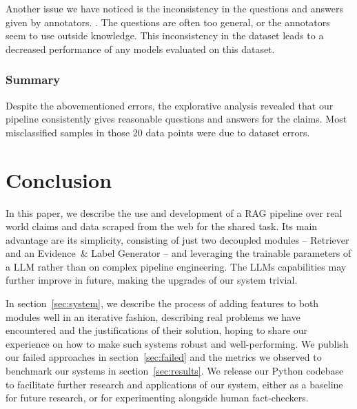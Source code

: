Another issue we have noticed is the inconsistency in the questions and answers given by annotators. . The questions are often too general, or the annotators seem to use outside knowledge. This inconsistency in the dataset leads to a decreased performance of any models evaluated on this dataset.

\subsubsection{Summary}
Despite the abovementioned errors, the explorative analysis revealed that our pipeline consistently gives reasonable questions and answers for the claims. Most misclassified samples in those 20 data points were due to dataset errors.


\section{Conclusion}
\label{sec:conclusion}
In this paper, we describe the use and development of a RAG pipeline over real world claims and data scraped from the web for the \averitec{} shared task.
Its main advantage are its simplicity, consisting of just two decoupled modules -- Retriever and an Evidence~\& Label Generator -- and leveraging the trainable parameters of a LLM rather than on complex pipeline engineering.
The LLMs capabilities may further improve in future, making the upgrades of our system trivial.

In section~\ref{sec:system}, we describe the process of adding features to both modules well in an iterative fashion, describing real problems we have encountered and the justifications of their solution, hoping to share our experience on how to make such systems robust and well-performing.
We publish our failed approaches in section~\ref{sec:failed} and the metrics we observed to benchmark our systems in section~\ref{sec:results}. 
We release our Python codebase to facilitate further research and applications of our system, either as a baseline for future research, or for experimenting alongside human fact-checkers.

